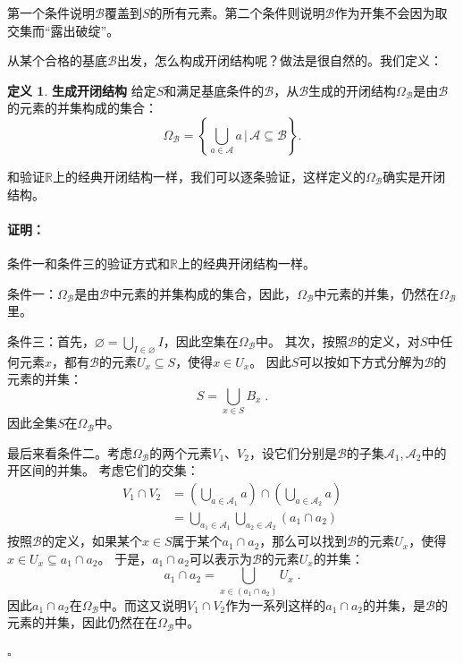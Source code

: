 \documentclass[12pt,UTF8]{ctexbook}
\theoremstyle{definition}
\newtheorem{df}{定义}[section]
\theoremstyle{plain}
\renewenvironment{proof}{\paragraph{\textbf{证明：}}}{\hfill$\square$}
\begin{document}
\begin{appendix}
第一个条件说明$\mathcal{B}$覆盖到$S$的所有元素。第二个条件则说明$\mathcal{B}$作为开集不会因为取交集而“露出破绽”。

从某个合格的基底$\mathcal{B}$出发，怎么构成开闭结构呢？做法是很自然的。我们定义：
\begin{df}{\textbf{生成开闭结构}}
    给定$S$和满足基底条件的$\mathcal{B}$，从$\mathcal{B}$生成的开闭结构$\Omega_{\mathcal{B}}$是由$\mathcal{B}$的元素的并集构成的集合：
    $$ \Omega_{\mathcal{B}} =\left\{\bigcup_{a \in \mathcal{A}} a \, \Bigg| \,\mathcal{A} \subseteq  \mathcal{B} \right\}.  $$
\end{df}

和验证$\mathbb{R}$上的经典开闭结构一样，我们可以逐条验证，这样定义的$\Omega_{\mathcal{B}}$确实是开闭结构。

\begin{proof}
    条件一和条件三的验证方式和$\mathbb{R}$上的经典开闭结构一样。

    条件一：$\Omega_{\mathcal{B}}$是由$\mathcal{B}$中元素的并集构成的集合，因此，$\Omega_{\mathcal{B}}$中元素的并集，仍然在$\Omega_{\mathcal{B}}$里。

    条件三：首先，$\varnothing = \bigcup_{I \in \varnothing} I $，因此空集在$\Omega_{\mathcal{B}}$中。
    其次，按照$\mathcal{B}$的定义，对$S$中任何元素$x$，都有$\mathcal{B}$的元素$U_x\subseteq S$，使得$x\in U_x$。
    因此$S$可以按如下方式分解为$\mathcal{B}$的元素的并集：
    $$ S = \bigcup_{x\in S} B_x \;. $$
    因此全集$S$在$\Omega_{\mathcal{B}}$中。

    最后来看条件二。考虑$\Omega_{\mathcal{B}}$的两个元素$V_1$、$V_2$，设它们分别是$\mathcal{B}$的子集$\mathcal{A}_1, \mathcal{A}_2$中的开区间的并集。
    考虑它们的交集：
    \begin{align*}
        V_1\cap V_2 &= \left(\bigcup_{a \in \mathcal{A}_1} a\right) \cap \left(\bigcup_{a \in \mathcal{A}_2} a\right) \\
        &= \bigcup_{a_1 \in \mathcal{A}_1} \bigcup_{a_2 \in \mathcal{A}_2} (a_1 \cap a_2)   
    \end{align*}
    按照$\mathcal{B}$的定义，如果某个$x\in S$属于某个$a_1 \cap a_2$，那么可以找到$\mathcal{B}$的元素$U_x$，使得$x\in U_x \subseteq a_1\cap a_2$。
    于是，$a_1 \cap a_2$可以表示为$\mathcal{B}$的元素$U_x$的并集：
    $$ a_1 \cap a_2 = \bigcup_{x\in (a_1 \cap a_2)} U_x \;. $$
    因此$a_1 \cap a_2$在$\Omega_{\mathcal{B}}$中。而这又说明$V_1\cap V_2$作为一系列这样的$a_1 \cap a_2$的并集，是$\mathcal{B}$的元素的并集，因此仍然在在$\Omega_{\mathcal{B}}$中。

\end{proof}


\end{appendix}
\end{document}

